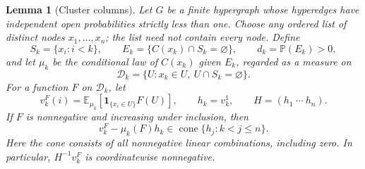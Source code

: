 \documentclass[11pt]{article}
\newtheorem{lemma}[theorem]{Lemma}
\theoremstyle{definition}
\theoremstyle{remark}
\numberwithin{equation}{section}
\begin{document}
\begin{lemma}[Cluster columns]\label{cmp:cone}
Let $G$ be a finite hypergraph whose hyperedges have independent open
probabilities strictly less than one.
Choose any ordered list of distinct nodes $x_1,\ldots,x_n$; the list need
not contain every node. Define
\[
 S_k=\{x_i:i<k\},\qquad
 E_k=\{C(x_k)\cap S_k=\varnothing\},\qquad
 d_k=\mathbb P(E_k)>0,
\]
and let $\mu_k$ be the conditional law of $C(x_k)$ given $E_k$, regarded
as a measure on
\[
 \mathcal D_k=\{U:x_k\in U,\ U\cap S_k=\varnothing\}.
\]
For a function $F$ on $\mathcal D_k$, let
\[
 v_k^F(i)=\mathbb E_{\mu_k}
       [\mathbf 1_{\{x_i\in U\}}F(U)],\qquad
 h_k=v_k^1,\qquad H=(h_1\ \cdots\ h_n).
\]
If $F$ is nonnegative and increasing under inclusion, then
\begin{equation}\label{cmp:cone-relation}
 v_k^F-\mu_k(F)h_k
   \in\operatorname{cone}\{h_j:k<j\le n\}.
\end{equation}
Here the cone consists of all nonnegative linear combinations, including
zero. In particular, $H^{-1}v_k^F$ is coordinatewise nonnegative.
\end{lemma}
\end{document}
